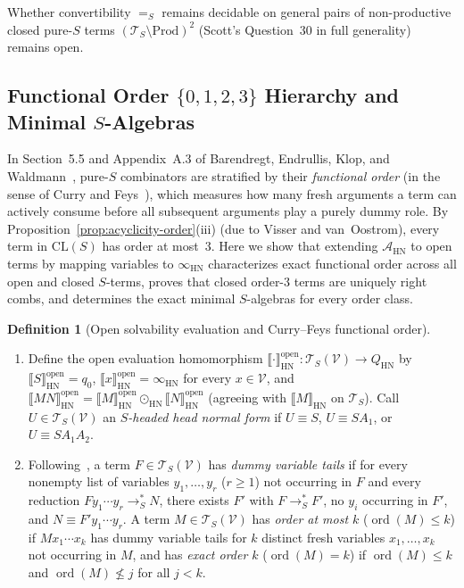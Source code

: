 \documentclass[11pt,reqno]{amsart}
\numberwithin{equation}{section}
\theoremstyle{plain}
\theoremstyle{definition}
\newtheorem{definition}[theorem]{Definition}
\theoremstyle{remark}
\DeclareMathOperator{\ord}{ord}
\newcommand{\CLS}{\mathrm{CL}(S)}
\newcommand{\TS}{\mathcal{T}_S}
\newcommand{\TSV}{\mathcal{T}_S(\mathcal{V})}
\newcommand{\HN}{\mathrm{HN}}
\newcommand{\Prod}{\mathrm{Prod}}
\newcommand{\sem}[1]{\llbracket #1 \rrbracket}
\newcommand{\redSs}{\to_S^*}
\newcommand{\convS}{=_S}
\begin{document}
Whether convertibility $\convS$ remains decidable on general pairs of non-productive closed pure-$S$ terms $(\TS \setminus \Prod)^2$ (Scott's Question~30 in full generality) remains open.

\subsection{Functional Order \texorpdfstring{$\{0, 1, 2, 3\}$}{\{0, 1, 2, 3\}} Hierarchy and Minimal \texorpdfstring{$S$}{S}-Algebras}\label{subsec:order-hierarchy}

In Section~5.5 and Appendix~A.3 of Barendregt, Endrullis, Klop, and Waldmann~\cite[pp.~89--91, 99--101]{BarendregtEndrullisKlopWaldmann2017}, pure-$S$ combinators are stratified by their \emph{functional order} (in the sense of Curry and Feys~\cite{CurryFeys1958}), which measures how many fresh arguments a term can actively consume before all subsequent arguments play a purely dummy role. By Proposition~\ref{prop:acyclicity-order}(iii) (due to Visser and van~Oostrom), every term in $\CLS$ has order at most~$3$. Here we show that extending $\mathcal{A}_{\HN}$ to open terms by mapping variables to $\infty_{\HN}$ characterizes exact functional order across all open and closed $S$-terms, proves that closed order-$3$ terms are uniquely right combs, and determines the exact minimal $S$-algebras for every order class.

\begin{definition}[Open solvability evaluation and Curry--Feys functional order]\label{def:open-hn-order}
\begin{enumerate}[label=(\roman*),leftmargin=2.2em]
  \item Define the open evaluation homomorphism $\sem{\cdot}_{\HN}^{\mathrm{open}} \colon \TSV \to Q_{\HN}$ by $\sem{S}_{\HN}^{\mathrm{open}} = q_0$, $\sem{x}_{\HN}^{\mathrm{open}} = \infty_{\HN}$ for every $x \in \mathcal{V}$, and $\sem{M N}_{\HN}^{\mathrm{open}} = \sem{M}_{\HN}^{\mathrm{open}} \odot_{\HN} \sem{N}_{\HN}^{\mathrm{open}}$ (agreeing with $\sem{M}_{\HN}$ on $\TS$). Call $U \in \TSV$ an \emph{$S$-headed head normal form} if $U \equiv S$, $U \equiv S A_1$, or $U \equiv S A_1 A_2$.
  \item Following~\cite[Definition~37, p.~99]{BarendregtEndrullisKlopWaldmann2017}, a term $F \in \TSV$ has \emph{dummy variable tails} if for every nonempty list of variables $y_1, \dots, y_r$ ($r \ge 1$) not occurring in $F$ and every reduction $F y_1 \cdots y_r \redSs N$, there exists $F'$ with $F \redSs F'$, no $y_i$ occurring in $F'$, and $N \equiv F' y_1 \cdots y_r$. A term $M \in \TSV$ has \emph{order at most $k$} ($\ord(M) \le k$) if $M x_1 \cdots x_k$ has dummy variable tails for $k$ distinct fresh variables $x_1, \dots, x_k$ not occurring in $M$, and has \emph{exact order $k$} ($\ord(M) = k$) if $\ord(M) \le k$ and $\ord(M) \not\le j$ for all $j < k$.
\end{enumerate}
\end{definition}
\end{document}
